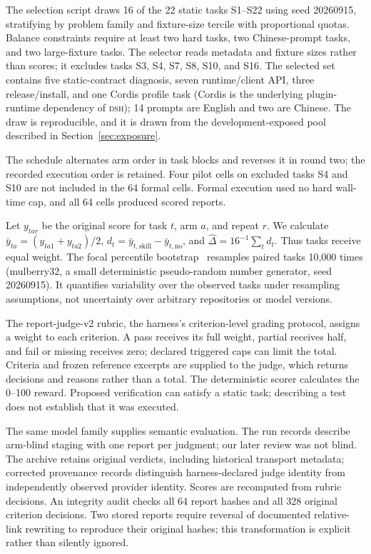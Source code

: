 \documentclass[11pt]{article}
\newcommand{\framework}{\textsc{dsh}}
\begin{document}
The selection script draws 16 of the 22 static tasks S1--S22 using seed 20260915, stratifying by problem family and fixture-size tercile with proportional quotas. Balance constraints require at least two hard tasks, two Chinese-prompt tasks, and two large-fixture tasks. The selector reads metadata and fixture sizes rather than scores; it excludes tasks S3, S4, S7, S8, S10, and S16. The selected set contains five static-contract diagnosis, seven runtime/client API, three release/install, and one Cordis profile task (Cordis is the underlying plugin-runtime dependency of \framework{}); 14 prompts are English and two are Chinese. The draw is reproducible, and it is drawn from the development-exposed pool described in Section~\ref{sec:exposure}.

The schedule alternates arm order in task blocks and reverses it in round two; the recorded execution order is retained. Four pilot cells on excluded tasks S4 and S10 are not included in the 64 formal cells. Formal execution used no hard wall-time cap, and all 64 cells produced scored reports.

Let $y_{tar}$ be the original score for task $t$, arm $a$, and repeat $r$. We calculate $\bar y_{ta}=(y_{ta1}+y_{ta2})/2$, $d_t=\bar y_{t,\mathrm{skill}}-\bar y_{t,\mathrm{no}}$, and $\widehat\Delta=16^{-1}\sum_t d_t$. Thus tasks receive equal weight. The focal percentile bootstrap~\citep{efron1993bootstrap} resamples paired tasks 10,000 times (mulberry32, a small deterministic pseudo-random number generator, seed 20260915). It quantifies variability over the observed tasks under resampling assumptions, not uncertainty over arbitrary repositories or model versions.

The report-judge-v2 rubric, the harness's criterion-level grading protocol, assigns a weight to each criterion. A pass receives its full weight, partial receives half, and fail or missing receives zero; declared triggered caps can limit the total. Criteria and frozen reference excerpts are supplied to the judge, which returns decisions and reasons rather than a total. The deterministic scorer calculates the 0--100 reward. Proposed verification can satisfy a static task; describing a test does not establish that it was executed.

The same model family supplies semantic evaluation. The run records describe arm-blind staging with one report per judgment; our later review was not blind. The archive retains original verdicts, including historical transport metadata; corrected provenance records distinguish harness-declared judge identity from independently observed provider identity. Scores are recomputed from rubric decisions. An integrity audit checks all 64 report hashes and all 328 original criterion decisions. Two stored reports require reversal of documented relative-link rewriting to reproduce their original hashes; this transformation is explicit rather than silently ignored.
\end{document}

